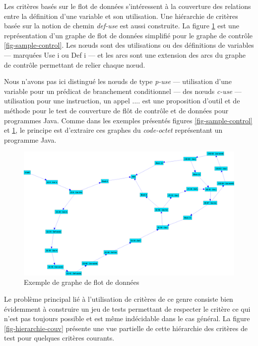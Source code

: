 Les crit\`eres bas\'es sur le flot de donn\'ees s'int\'eressent
\`a la couverture des relations entre la d\'efinition d'une
variable et son utilisation. Une hi\'erarchie de 
crit\`eres bas\'ee sur la notion de chemin \emph{def-use} est aussi construite. La figure
\ref{fig-sample-data} est une repr\'esentation d'un graphe de
flot de donn\'ees simplifi\'e pour le graphe de contr\^ole
\ref{fig-sample-control}. Les n\oe uds sont des utilisations ou des
d\'efinitions de variables --- marqu\'ees \textsf{Use i} ou
\textsf{Def i} --- et les arcs sont une extension des arcs du graphe
de contr\^ole permettant de relier chaque n\oe ud. 

Nous n'avons pas ici distingu\'e les n\oe uds de type
\emph{p-use} --- utilisation d'une variable pour un pr\'edicat de
branchement conditionnel --- des n\oe uds \emph{c-use} --- utilisation
pour une instruction, un appel .... \cite{vincenzi-covtest-java} est une proposition d'outil et de
m\'ethode pour le test de couverture de fl\^ot de contr\^ole et de
donn\'ees pour programmes \textsf{Java}. Comme dans les exemples
pr\'esent\'es figures \ref{fig-sample-control} et
\ref{fig-sample-data}, le principe est d'extraire ces graphes du
\emph{code-octet} repr\'esentant un programme \textsf{Java}.

\begin{figure}[htbp]
    \includegraphics[width=\textwidth]{figures/fig-sample-data.eps}
    \caption{Exemple de graphe de flot de donn\'ees}
    \label{fig-sample-data}
\end{figure}

Le probl\`eme principal li\'e \`a l'utilisation de crit\`eres de
ce genre consiste bien \'evidemment \`a construire un jeu de tests
permettant de respecter le crit\`ere ce qui n'est pas toujours
possible et est m\^eme ind\'ecidable dans le cas g\'en\'eral.
La figure \ref{fig-hierarchie-couv} pr\'esente une vue partielle de
cette hi\'erarchie des crit\`eres de test pour quelques crit\`eres courants.


